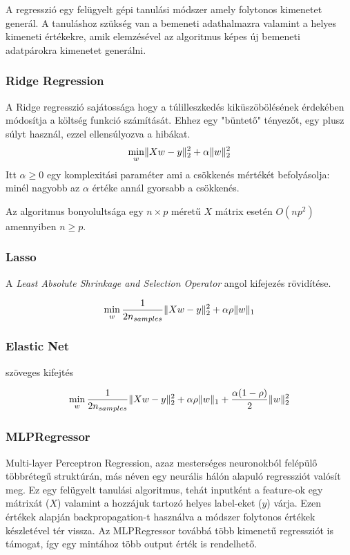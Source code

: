  \label{subsec:regression}
A regresszió egy felügyelt gépi tanulási módszer amely folytonos kimenetet generál. A tanuláshoz szükség van a bemeneti adathalmazra valamint a helyes kimeneti értékekre, amik elemzésével az algoritmus képes új bemeneti adatpárokra kimenetet generálni.

\subsubsection{Ridge Regression}

A Ridge regresszió sajátossága hogy a túlilleszkedés kiküszöbölésének érdekében módosítja a költség funkció számítását. Ehhez egy "büntető" tényezőt, egy plusz súlyt használ, ezzel ellensúlyozva a hibákat.
$$ \min_{w} \lVert Xw-y\rVert_2^2 + \alpha \lVert w\rVert_2^2$$ 
Itt $\alpha \geq 0 $ egy komplexitási paraméter ami a csökkenés mértékét befolyásolja: minél nagyobb az $\alpha$ értéke annál gyorsabb a csökkenés.

Az algoritmus bonyolultsága egy $n \times p$ méretű $X$ mátrix esetén $O(np^2)$ amennyiben $n \geq p$. 

\subsubsection{Lasso}
A \textit{Least Absolute Shrinkage and Selection Operator} angol kifejezés rövidítése. 

$$ \min_{w}\frac{1}{2n_{samples}} \lVert Xw-y\rVert_2^2 + \alpha\rho \lVert w\rVert_1$$

\subsubsection{Elastic Net}
\TODO szöveges kifejtés

$$ \min_{w}\frac{1}{2n_{samples}} \lVert Xw-y\rVert_2^2 + \alpha\rho \lVert w\rVert_1 + \frac{\alpha(1-\rho)}{2} \lVert w\rVert_2^2$$

\subsubsection{MLPRegressor} \label{ssec:mlpregressor}
Multi-layer Perceptron Regression, azaz mesterséges neuronokból felépülő többrétegű struktúrán, más néven egy neurális hálón alapuló regressziót valósít meg. Ez egy felügyelt tanulási algoritmus, tehát inputként a feature-ok egy mátrixát ($X$) valamint a hozzájuk tartozó helyes label-eket ($y$) várja. Ezen értékek alapján backpropagation-t használva a módszer folytonos értékek készletével tér vissza. Az MLPRegressor továbbá több kimenetű regressziót is támogat, így egy mintához több output érték is rendelhető.



